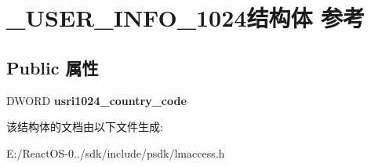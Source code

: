 \hypertarget{struct___u_s_e_r___i_n_f_o__1024}{}\section{\+\_\+\+U\+S\+E\+R\+\_\+\+I\+N\+F\+O\+\_\+1024结构体 参考}
\label{struct___u_s_e_r___i_n_f_o__1024}
\subsection*{Public 属性}
\begin{DoxyCompactItemize}
\item 
\mbox{\label{struct___u_s_e_r___i_n_f_o__1024_a7aa1d77dfdb5d7af9dcdafdf8faff18f}} 
D\+W\+O\+RD {\bfseries usri1024\+\_\+country\+\_\+code}
\end{DoxyCompactItemize}


该结构体的文档由以下文件生成\+:\begin{DoxyCompactItemize}
\item 
E\+:/\+React\+O\+S-\/0../sdk/include/psdk/lmaccess.\+h\end{DoxyCompactItemize}
